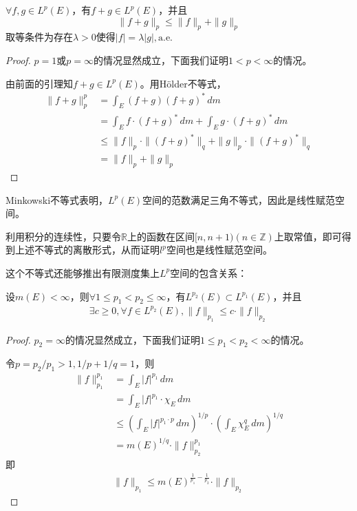 \documentclass{ctexbook}
\begin{document}
\begin{theorem}[Minkowski不等式]
    $\forall f,g\in L^p(E)$，有$f+g\in L^p(E)$，并且
    \[\|f+g\|_p\leq \|f\|_p+\|g\|_p\]
    取等条件为存在$\lambda>0$使得$|f|=\lambda |g|,\text{a.e.}$
\end{theorem}
\begin{proof}
    $p=1$或$p=\infty$的情况显然成立，下面我们证明$1<p<\infty$的情况。

    由前面的引理知$f+g\in L^p(E)$。用Hölder不等式，\begin{align*}
    \|f+g\|_p^p & =\int_{E}(f+g)(f+g)^*\,dm \\
                 & =\int_{E}f\cdot (f+g)^*\,dm+\int_{E}g\cdot (f+g)^*\,dm \\
                 & \leq \|f\|_p\cdot \|(f+g)^*\|_q+\|g\|_p\cdot \|(f+g)^*\|_q \\
                 & =\|f\|_p+\|g\|_p
    \end{align*}
\end{proof}

Minkowski不等式表明，$L^p(E)$空间的范数满足三角不等式，因此是线性赋范空间。

利用积分的连续性，只要令$\mathbb{R} $上的函数在区间$[n,n+1)(n\in\mathbb{Z} )$上取常值，即可得到上述不等式的离散形式，从而证明$l^p$空间也是线性赋范空间。

这个不等式还能够推出有限测度集上$L^p$空间的包含关系：
\begin{corollary}
    设$m(E)<\infty$，则$\forall 1\leq p_1<p_2\leq \infty$，有$L^{p_2}(E)\subset L^{p_1}(E)$，并且\begin{align*}
        \exists c\geq 0,\forall f\in L^{p_2}(E),\|f\|_{p_1}\leq c\cdot \|f\|_{p_2}
    \end{align*}
\end{corollary}
\begin{proof}
    $p_2=\infty$的情况显然成立，下面我们证明$1\leq p_1<p_2<\infty$的情况。

    令$p=p_2/p_1>1,1/p+1/q=1$，则\begin{align*}
        \|f\|_{p_1}^{p_1} & =\int_{E}|f|^{p_1}\,dm \\
                     & =\int_{E}|f|^{p_1}\cdot \chi_E\,dm \\
                     & \leq \left(\int_{E}|f|^{p_1\cdot p}\,dm\right)^{1/p}\cdot \left(\int_{E}\chi_E^q\,dm\right)^{1/q} \\
                     & =m(E)^{1/q}\cdot \|f\|_{p_2}^{p_1}
    \end{align*}
    即\begin{align*}
        \|f\|_{p_1}\leq m(E)^{\frac{1}{p_1}-\frac{1}{p_2}}\cdot \|f\|_{p_2}
    \end{align*}
\end{proof}
\end{document}
